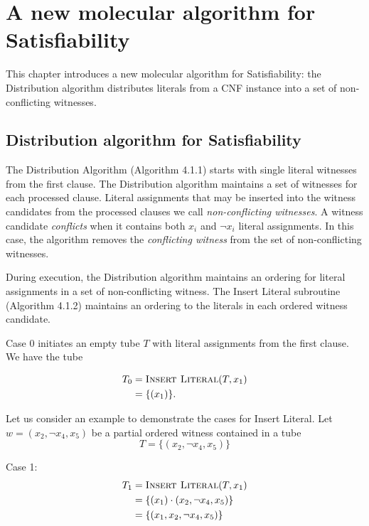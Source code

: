 
\chapter{A new molecular algorithm for {\sc Satisfiability}}

This chapter introduces a new molecular algorithm for {\sc Satisfiability}: the Distribution algorithm distributes literals from a CNF instance into a set of non-conflicting witnesses. 

\section{Distribution algorithm for {\sc Satisfiability}}

The {\sc Distribution Algorithm} (Algorithm 4.1.1) starts with single literal witnesses from the first clause.  The Distribution algorithm maintains a set of witnesses for each processed clause.  Literal assignments that may be inserted into the witness candidates from the processed clauses we call \emph{non-conflicting witnesses}.  A witness candidate \emph{conflicts} when it contains both $x_i$ and $\neg x_i$ literal assignments.  In this case, the algorithm removes the \emph{conflicting witness} from the set of non-conflicting witnesses.  


\FloatBarrier

During execution, the Distribution algorithm maintains an ordering for literal assignments in a set of non-conflicting witness.  The {\sc Insert Literal} subroutine (Algorithm 4.1.2) maintains an ordering to the literals in each ordered witness candidate.

Case 0 initiates an empty tube $T$ with literal assignments from the first clause.  We have the tube

\begin{align*}
T_0 &= \text{{\sc Insert Literal}}(T, x_1)\\
    &= \{ (x_1) \}. \\
\end{align*}	

Let us consider an example to demonstrate the cases for {\sc Insert Literal}.  Let $w = (x_2, \neg x_4, x_5)$ be a partial ordered witness contained in a tube
\[
T = \{ (x_2, \neg x_4, x_5) \}
\]

Case 1:
\begin{align*}
T_1 &= \text{{\sc Insert Literal}}(T, x_1)\\
    &= \{ (x_1) \cdot (x_2, \neg x_4, x_5) \} \\
    &= \{ (x_1, x_2, \neg x_4, x_5) \} 
\end{align*}	

